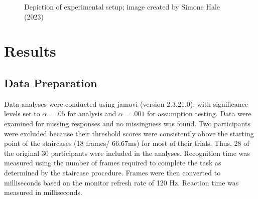 \documentclass[
  10pt,
  letterpaper,
]{article}
\begin{document}
\begin{figure}


\caption{\label{fig-setup}Depiction of experimental setup; image created
by Simone Hale (2023)}

\end{figure}%

\section{Results}\label{results}

\subsection{Data Preparation}\label{data-preparation}

Data analyses were conducted using jamovi (version 2.3.21.0), with
significance levels set to \(\alpha = .05\) for analysis and
\(\alpha = .001\) for assumption testing. Data were examined for missing
responses and no missingness was found. Two participants were excluded
because their threshold scores were consistently above the starting
point of the staircases (18 frames/ 66.67ms) for most of their trials.
Thus, 28 of the original 30 participants were included in the analyses.
Recognition time was measured using the number of frames required to
complete the task as determined by the staircase procedure. Frames were
then converted to milliseconds based on the monitor refresh rate of 120
Hz. Reaction time was measured in milliseconds.
\end{document}

